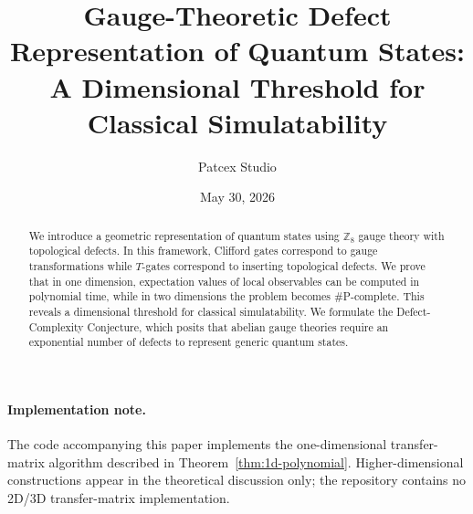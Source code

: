 \documentclass[12pt]{article}
\title{Gauge-Theoretic Defect Representation of Quantum States:\\A Dimensional Threshold for Classical Simulatability}
\author{Patcex Studio}
\date{May 30, 2026}
\theoremstyle{plain}
\theoremstyle{definition}
\begin{document}
\maketitle

\begin{abstract}
We introduce a geometric representation of quantum states using $\mathbb{Z}_8$ gauge theory with topological defects. In this framework, Clifford gates correspond to gauge transformations while $T$-gates correspond to inserting topological defects. We prove that in one dimension, expectation values of local observables can be computed in polynomial time, while in two dimensions the problem becomes \#P-complete. This reveals a dimensional threshold for classical simulatability. We formulate the Defect-Complexity Conjecture, which posits that abelian gauge theories require an exponential number of defects to represent generic quantum states.
\end{abstract}

\tableofcontents

\paragraph{Implementation note.}
The code accompanying this paper implements the one-dimensional transfer-matrix algorithm described in Theorem~\ref{thm:1d-polynomial}. Higher-dimensional constructions appear in the theoretical discussion only; the repository contains no 2D/3D transfer-matrix implementation.








\end{document}
